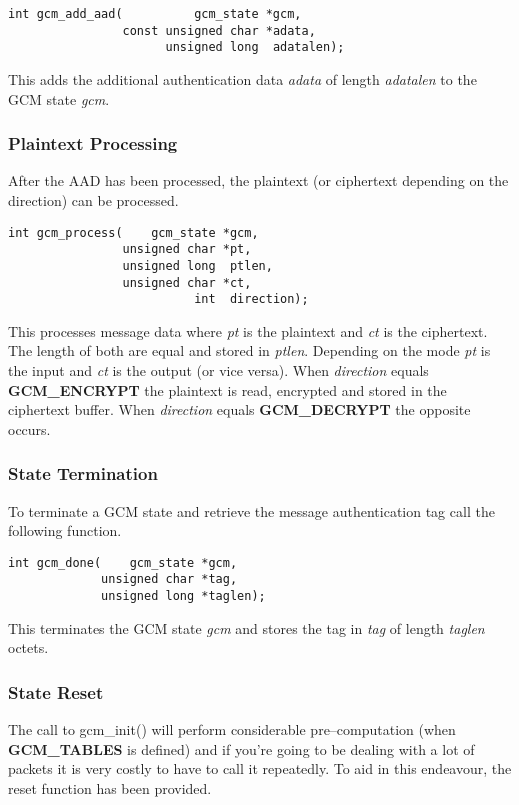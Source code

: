 \documentclass[synpaper]{book}
\begin{document}
\begin{verbatim}
int gcm_add_aad(          gcm_state *gcm, 
                const unsigned char *adata, 
                      unsigned long  adatalen);
\end{verbatim}
This adds the additional authentication data \textit{adata} of length \textit{adatalen} to the GCM state \textit{gcm}.

\subsubsection{Plaintext Processing}
After the AAD has been processed, the plaintext (or ciphertext depending on the direction) can be processed.  

\begin{verbatim}
int gcm_process(    gcm_state *gcm,
                unsigned char *pt, 
                unsigned long  ptlen,
                unsigned char *ct,
                          int  direction);
\end{verbatim}
This processes message data where \textit{pt} is the plaintext and \textit{ct} is the ciphertext.  The length of both are equal and stored in \textit{ptlen}.  Depending on 
the mode \textit{pt} is the input and \textit{ct} is the output (or vice versa).  When \textit{direction} equals \textbf{GCM\_ENCRYPT} the plaintext is read, 
encrypted and stored in the ciphertext buffer.  When \textit{direction} equals \textbf{GCM\_DECRYPT} the opposite occurs.

\subsubsection{State Termination}
To terminate a GCM state and retrieve the message authentication tag call the following function.

\begin{verbatim}
int gcm_done(    gcm_state *gcm, 
             unsigned char *tag, 
             unsigned long *taglen);
\end{verbatim}
This terminates the GCM state \textit{gcm} and stores the tag in \textit{tag} of length \textit{taglen} octets.

\subsubsection{State Reset}
The call to gcm\_init() will perform considerable pre--computation (when \textbf{GCM\_TABLES} is defined) and if you're going to be dealing with a lot of packets
it is very costly to have to call it repeatedly.  To aid in this endeavour, the reset function has been provided.
\end{document}
